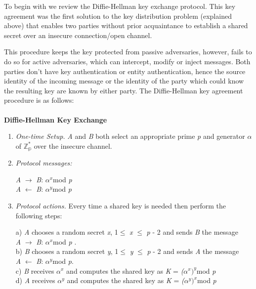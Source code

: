 \documentclass[iwp,first]{luthesis}
\begin{document}
To begin with we review the Diffie-Hellman key exchange protocol. This key agreement was the first solution to the key distribution problem (explained above) that enables two parties without prior acquaintance to establish a shared secret over an insecure connection/open channel. 

This procedure keeps the key protected from passive adversaries, however, fails to do so for active adversaries, which can intercept, modify or inject messages. Both parties don't have key authentication or entity authentication, hence the source identity of the incoming message or the identity of the party which could know the resulting key are known by either party. The Diffie-Hellman key agreement procedure is as follows:
\\
\\
\textbf{Diffie-Hellman Key Exchange}

\begin{enumerate}

\item \textit{One-time Setup.} \textit{A} and \textit{B} both select an appropriate prime \textit{p} and generator \textit{$\alpha$} of $\mathbb{Z^*_p}$ over the insecure channel.

\item \textit{Protocol messages:}

\begin{center}
\textit{A} $\longrightarrow$ \textit{B}: $\alpha^x$mod \textit{p} 
\\
\textit{A} $\longleftarrow$ \textit{B}: $\alpha^y$mod \textit{p}
\end{center}

\item \textit{Protocol actions.} Every time a shared key is needed then perform the following steps:

a) \textit{A} chooses a random secret \textit{x}, 1$\leq$ \textit{x} $\leq$ \textit{p} - 2 and sends \textit{B} the message 
\\ \textit{A} $\longrightarrow$ \textit{B}: $\alpha^x$mod \textit{p} .
\\
b) \textit{B} chooses a random secret \textit{y}, 1$\leq$ \textit{y} $\leq$ \textit{p} - 2 and sends \textit{A} the message 
\\ \textit{A} $\longleftarrow$ \textit{B}: $\alpha^y$mod \textit{p}.
\\
c) \textit{B} receives \textit{$\alpha^x$} and computes the shared key as \textit{K} = \textit{($\alpha^x)^y$}mod \textit{p}
\\
d) \textit{A} receives $\alpha^y$ and computes the shared key as \textit{K} = \textit{($\alpha^y)^x$}mod \textit{p}

\end{enumerate}
\end{document}
